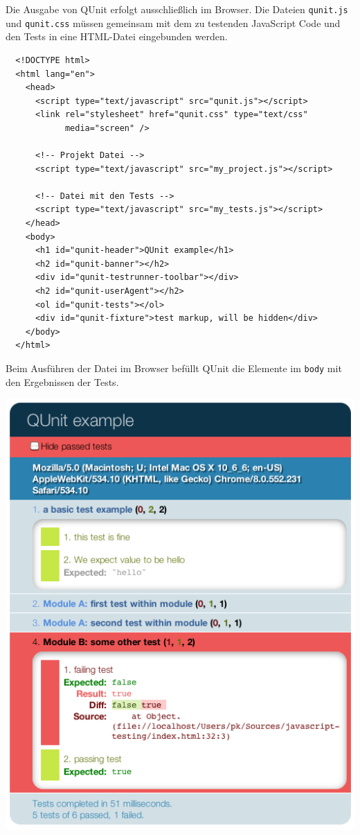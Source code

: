 \documentclass[11pt, a4paper]{article}
\begin{document}
Die Ausgabe von QUnit erfolgt ausschließlich im Browser. Die Dateien
\texttt{qunit.js} und \texttt{qunit.css} müssen gemeinsam mit dem zu testenden
JavaScript Code und den Tests in eine HTML-Datei eingebunden werden.

\begin{verbatim}
  <!DOCTYPE html>
  <html lang="en">
    <head>
      <script type="text/javascript" src="qunit.js"></script>
      <link rel="stylesheet" href="qunit.css" type="text/css"
            media="screen" />

      <!-- Projekt Datei -->
      <script type="text/javascript" src="my_project.js"></script>

      <!-- Datei mit den Tests -->
      <script type="text/javascript" src="my_tests.js"></script>
    </head>
    <body>
      <h1 id="qunit-header">QUnit example</h1>
      <h2 id="qunit-banner"></h2>
      <div id="qunit-testrunner-toolbar"></div>
      <h2 id="qunit-userAgent"></h2>
      <ol id="qunit-tests"></ol>
      <div id="qunit-fixture">test markup, will be hidden</div>
    </body>
  </html>
\end{verbatim}

Beim Ausführen der Datei im Browser befüllt QUnit die Elemente im
\texttt{body} mit den Ergebnissen der Tests.

\begin{center}
  \includegraphics[width = 1\textwidth]{QUnit.png}
\end{center}
\end{document}
